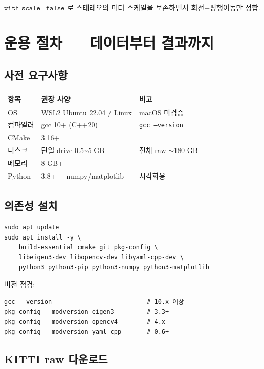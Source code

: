 \documentclass[11pt,a4paper,oneside]{report}
\begin{document}
\(\texttt{with\_scale=false}\) 로 스테레오의 미터 스케일을 보존하면서 회전+평행이동만 정합.


\chapter{운용 절차 — 데이터부터 결과까지}

\section{사전 요구사항}

\begin{center}\small
\begin{tabular}{lll}
\toprule
항목 & 권장 사양 & 비고 \\
\midrule
OS & WSL2 Ubuntu 22.04 / Linux & macOS 미검증 \\
컴파일러 & gcc 10+ (C++20) & \texttt{gcc --version} \\
CMake & 3.16+ & \\
디스크 & 단일 drive 0.5\textasciitilde{}5 GB & 전체 raw \(\sim\)180 GB \\
메모리 & 8 GB+ & \\
Python & 3.8+ + numpy/matplotlib & 시각화용 \\
\bottomrule
\end{tabular}
\end{center}

\section{의존성 설치}

\begin{lstlisting}[style=shell]
sudo apt update
sudo apt install -y \
    build-essential cmake git pkg-config \
    libeigen3-dev libopencv-dev libyaml-cpp-dev \
    python3 python3-pip python3-numpy python3-matplotlib
\end{lstlisting}

버전 점검:
\begin{lstlisting}[style=shell]
gcc --version                          # 10.x 이상
pkg-config --modversion eigen3         # 3.3+
pkg-config --modversion opencv4        # 4.x
pkg-config --modversion yaml-cpp       # 0.6+
\end{lstlisting}

\section{KITTI raw 다운로드}
\end{document}
